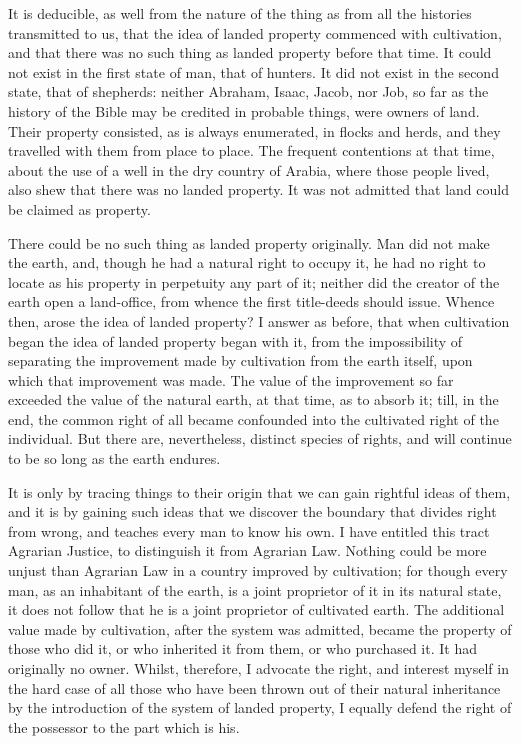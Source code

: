 It is deducible, as well from the nature of the thing as from all the histories transmitted to us, that the idea of landed property commenced with cultivation, and that there was no such thing as landed property before that time. It could not exist in the first state of man, that of hunters. It did not exist in the second state, that of shepherds: neither Abraham, Isaac, Jacob, nor Job, so far as the history of the Bible may be credited in probable things, were owners of land. Their property consisted, as is always enumerated, in flocks and herds, and they travelled with them from place to place. The frequent contentions at that time, about the use of a well in the dry country of Arabia, where those people lived, also shew that there was no landed property. It was not admitted that land could be claimed as property.\par

There could be no such thing as landed property originally. Man did not make the earth, and, though he had a natural right to occupy it, he had no right to locate as his property in perpetuity any part of it; neither did the creator of the earth open a land-office, from whence the first title-deeds should issue. Whence then, arose the idea of landed property? I answer as before, that when cultivation began the idea of landed property began with it, from the impossibility of separating the improvement made by cultivation from the earth itself, upon which that improvement was made. The value of the improvement so far exceeded the value of the natural earth, at that time, as to absorb it; till, in the end, the common right of all became confounded into the cultivated right of the individual. But there are, nevertheless, distinct species of rights, and will continue to be so long as the earth endures.\par

It is only by tracing things to their origin that we can gain rightful ideas of them, and it is by gaining such ideas that we discover the boundary that divides right from wrong, and teaches every man to know his own. I have entitled this tract Agrarian Justice, to distinguish it from Agrarian Law. Nothing could be more unjust than Agrarian Law in a country improved by cultivation; for though every man, as an inhabitant of the earth, is a joint proprietor of it in its natural state, it does not follow that he is a joint proprietor of cultivated earth. The additional value made by cultivation, after the system was admitted, became the property of those who did it, or who inherited it from them, or who purchased it. It had originally no owner. Whilst, therefore, I advocate the right, and interest myself in the hard case of all those who have been thrown out of their natural inheritance by the introduction of the system of landed property, I equally defend the right of the possessor to the part which is his.\par

